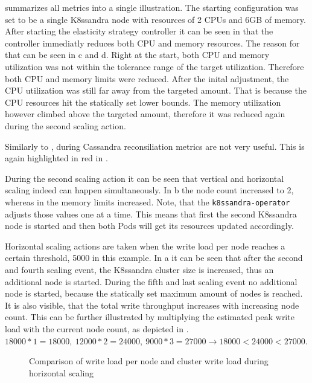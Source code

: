  summarizes all metrics into a single illustration. The starting configuration was set to be a single K8ssandra node with resources of 2 CPUs and 6GB of memory. After starting the elasticity strategy controller it can be seen in  that the controller immediatly reduces both CPU and memory resources. The reason for that can be seen in c and d. Right at the start, both CPU and memory utilization was not within the tolerance range of the target utilization. Therefore both CPU and memory limits were reduced. After the inital adjustment, the CPU utilization was still far away from the targeted amount. That is because the CPU resources hit the statically set lower bounds. The memory utilization however climbed above the targeted amount, therefore it was reduced again during the second scaling action.

Similarly to , during Cassandra reconsiliation metrics are not very useful. This is again highlighted in red in .

During the second scaling action it can be seen that vertical and horizontal scaling indeed can happen simultaneously. In b the node count increased to 2, whereas in  the memory limits increased. Note, that the \texttt{k8ssandra-operator} adjusts those values one at a time. This means that first the second K8ssandra node is started and then both Pods will get its resources updated accordingly.

Horizontal scaling actions are taken when the write load per node reaches a certain threshold, 5000 in this example. In a it can be seen that after the second and fourth scaling event, the K8ssandra cluster size is increased, thus an additional node is started. During the fifth and last scaling event no additional node is started, because the statically set maximum amount of nodes is reached. It is also visible, that the total write throughput increases with increasing node count. This can be further illustrated by multiplying the estimated peak write load with the current node count, as depicted in . \(18000 * 1 = 18000,\ 12000 * 2 = 24000,\ 9000 * 3 = 27000 \rightarrow 18000 < 24000 < 27000\).

\begin{figure}
    \centering
    
    \caption{Comparison of write load per node and cluster write load during horizontal scaling}
    \label{fig:diagonal-elasticity_cluster-write-load}
\end{figure}

